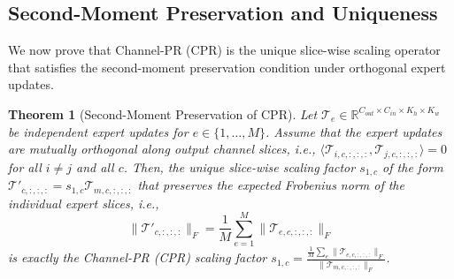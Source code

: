 \documentclass{article}
\theoremstyle{plain}
\newtheorem{theorem}{Theorem}[section]
\theoremstyle{definition}
\theoremstyle{remark}
\begin{document}
\subsection{Second-Moment Preservation and Uniqueness}
We now prove that Channel-PR (CPR) is the unique slice-wise scaling operator that satisfies the second-moment preservation condition under orthogonal expert updates.

\begin{theorem}[Second-Moment Preservation of CPR]
Let $\mathcal{T}_e \in \mathbb{R}^{C_{out} \times C_{in} \times K_h \times K_w}$ be independent expert updates for $e \in \{1,\dots,M\}$. Assume that the expert updates are mutually orthogonal along output channel slices, i.e., $\langle \mathcal{T}_{i, c, :, :, :}, \mathcal{T}_{j, c, :, :, :} \rangle = 0$ for all $i \neq j$ and all $c$. Then, the unique slice-wise scaling factor $s_{1, c}$ of the form $\mathcal{T}'_{c, :, :, :} = s_{1, c} \mathcal{T}_{m, c, :, :, :}$ that preserves the expected Frobenius norm of the individual expert slices, i.e.,
\begin{equation}
    \|\mathcal{T}'_{c, :, :, :}\|_F = \frac{1}{M} \sum_{e=1}^M \|\mathcal{T}_{e, c, :, :, :}\|_F
\end{equation}
is exactly the Channel-PR (CPR) scaling factor $s_{1, c} = \frac{\frac{1}{M}\sum_e \|\mathcal{T}_{e, c, :, :, :}\|_F}{\|\mathcal{T}_{m, c, :, :, :}\|_F}$.
\end{theorem}
\end{document}
